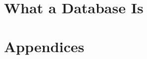 \documentclass[11pt,a4paper,oneside]{report}
\begin{document}


\part{What a Database Is}






\appendix
\part*{Appendices}


\end{document}
